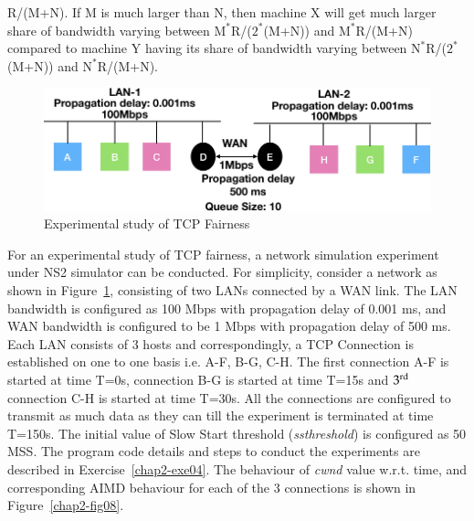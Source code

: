 \begin{multicols}{2}
R/(M+N). If M is much larger than N, then machine X will get much larger share of bandwidth varying between $\text{M}^{\ast}$R/($2^{\ast}$(M+N)) and $\text{M}^\ast$R/(M+N) compared to machine Y having its share of bandwidth varying between $\text{N}^{\ast}$R/($2^{\ast}$(M+N)) and $\text{N}^{\ast}$R/(M+N).

\begin{figure}[H]
\centering
\includegraphics[scale=1.15]{src/Figures/chap2/chap2-fig07.jpg}
\caption{Experimental study of TCP Fairness}\label{chap2-fig07}
\end{figure}

For an experimental study of TCP fairness, a network simulation experiment under NS2 simulator can be conducted. For simplicity, consider a network as shown in Figure~\ref{chap2-fig07}, consisting of two LANs connected by a WAN link. The LAN bandwidth is configured as 100 Mbps with propagation delay of 0.001 ms, and WAN bandwidth is configured to be 1 Mbps with propagation delay of 500 ms. Each LAN consists of 3 hosts and correspondingly, a TCP Connection is established on one to one basis i.e. A-F, B-G, C-H. The first connection A-F is started at time T=0s, connection B-G is started at time T=15s and ${\rm 3}^{\text{rd}}$ connection C-H is started at time T=30s. All the connections are configured to transmit as much data as they can  till the experiment is terminated at time T=150s. The initial value of Slow Start threshold (\textit{ssthreshold}) is configured as 50 MSS. The program code details and steps to conduct the experiments are described in Exercise~\ref{chap2-exe04}. The behaviour of \textit{cwnd} value w.r.t. time, and corresponding AIMD behaviour for each of the 3 connections is shown in Figure~\ref{chap2-fig08}. 


\end{multicols}
